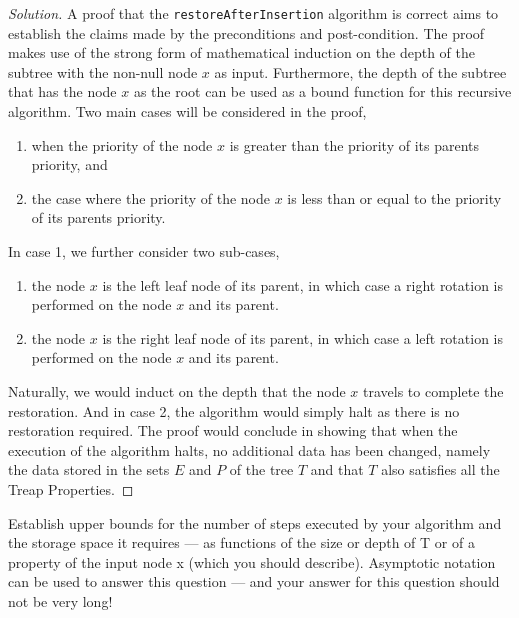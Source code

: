 \documentclass[12pt]{article}
\newenvironment{problem}[2][Problem]{\begin{trivlist}
\item[\hskip \labelsep {\bfseries #1}\hskip \labelsep {\bfseries #2.}]}{\end{trivlist}}
\newenvironment{solution}{\renewcommand\qedsymbol{$\blacksquare$}\begin{proof}[Solution]}{\end{proof}}
\begin{document}
\begin{solution}
    A proof that the \texttt{restoreAfterInsertion} algorithm is correct aims to establish the claims made by the preconditions and post-condition. The proof makes use of the strong form of mathematical induction on the depth of the subtree with the non-null node $x$ as input. Furthermore, the depth of the subtree that has the node $x$ as the root can be used as a bound function for this recursive algorithm. Two main cases will be considered in the proof, 

    \begin{enumerate}
        \item when the priority of the node $x$ is greater than the priority of its parents priority, and
        \item the case where the priority of the node $x$ is less than or equal to the priority of its parents priority.
    \end{enumerate}

    \noindent In case 1, we further consider two sub-cases,

    \begin{enumerate}
        \item the node $x$ is the left leaf node of its parent, in which case a right rotation is performed on the node $x$ and its parent. 
        \item the node $x$ is the right leaf node of its parent, in which case a left rotation is performed on the node $x$ and its parent.
    \end{enumerate}

    \noindent Naturally, we would induct on the depth that the node $x$ travels to complete the restoration. And in case 2, the algorithm would simply halt as there is no restoration required. The proof would conclude in showing that when the execution of the algorithm halts, no additional data has been changed, namely the data stored in the sets $E$ and $P$ of the tree $T$ and that $T$ also satisfies all the Treap Properties.

\end{solution}


\begin{problem}{5}
    Establish upper bounds for the number of steps executed by your algorithm and the storage space it requires — as functions of the size or depth of T or of a property of the input node x (which you should describe). Asymptotic notation can be used to answer this question — and your answer for this question should not be very long!
\end{problem}
\end{document}
